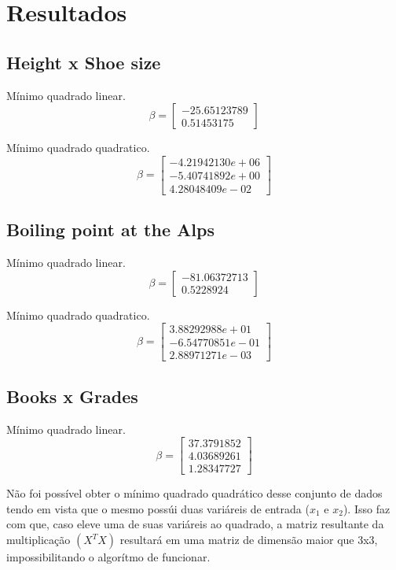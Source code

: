 \documentclass[a4paper, 11pt]{article}
\begin{document}
\newpage
\section*{Resultados}
\subsection*{Height x Shoe size}

Mínimo quadrado linear.
$$ \beta =
\begin{bmatrix}
-25.65123789 \\
  0.51453175
\end{bmatrix}
$$

Mínimo quadrado quadratico.
$$ \beta =
\begin{bmatrix}
-4.21942130e+06 \\
-5.40741892e+00\\
 4.28048409e-02
\end{bmatrix}
$$

\subsection*{Boiling point at the Alps}
Mínimo quadrado linear.
$$ \beta =
\begin{bmatrix}
-81.06372713 \\
  0.5228924
\end{bmatrix}
$$

Mínimo quadrado quadratico.
$$ \beta =
\begin{bmatrix}
 3.88292988e+01 \\
-6.54770851e-01\\
 2.88971271e-03
\end{bmatrix}
$$


\subsection*{Books x Grades}
Mínimo quadrado linear.
$$ \beta =
\begin{bmatrix}
37.3791852 \\
 4.03689261\\
 1.28347727
\end{bmatrix}
$$

Não foi possível obter o mínimo quadrado quadrático desse conjunto de dados tendo em vista que o mesmo possúi duas variáreis de entrada ($x_1$ e $x_2$). Isso faz com que, caso eleve uma de suas variáreis ao quadrado, a matriz resultante da multiplicação $ (X^T X) $ resultará em uma matriz de dimensão maior que 3x3, impossibilitando o algorítmo de funcionar.
\end{document}
